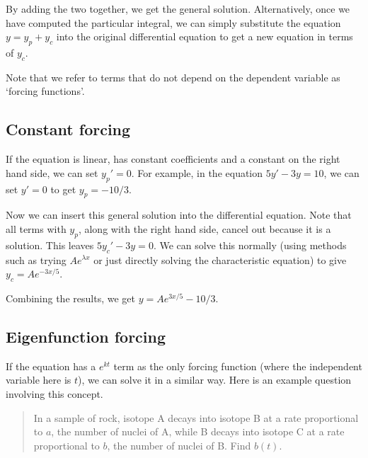 By adding the two together, we get the general solution.
Alternatively, once we have computed the particular integral, we can simply substitute the equation \(y = y_p + y_c\) into the original differential equation to get a new equation in terms of \(y_c\).

Note that we refer to terms that do not depend on the dependent variable as `forcing functions'.

\subsection{Constant forcing}
If the equation is linear, has constant coefficients and a constant on the right hand side, we can set \(y_p' = 0\).
For example, in the equation \(5y' - 3y = 10\), we can set \(y' = 0\) to get \(y_p = -10/3\).

Now we can insert this general solution into the differential equation.
Note that all terms with \(y_p\), along with the right hand side, cancel out because it is a solution.
This leaves \(5y_c' - 3y = 0\).
We can solve this normally (using methods such as trying \(Ae^{\lambda x}\) or just directly solving the characteristic equation) to give \(y_c = Ae^{-3x/5}\).

Combining the results, we get \(y = Ae^{3x/5} - 10/3\).

\subsection{Eigenfunction forcing}
If the equation has a \(e^{kt}\) term as the only forcing function (where the independent variable here is \(t\)), we can solve it in a similar way.
Here is an example question involving this concept.

\begin{quote}
	In a sample of rock, isotope A decays into isotope B at a rate proportional to \(a\), the number of nuclei of A, while B decays into isotope C at a rate proportional to \(b\), the number of nuclei of B.
	Find \(b(t)\).
\end{quote}

